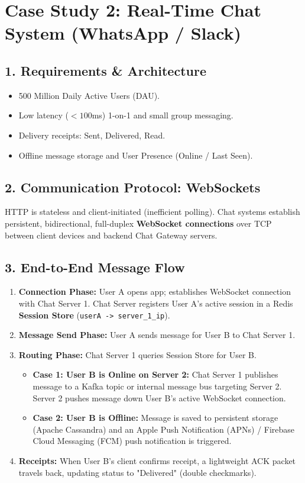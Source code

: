 \documentclass[10pt,journal,compsoc,onecolumn]{IEEEtran}
\begin{document}
\section{Case Study 2: Real-Time Chat System (WhatsApp / Slack)}
\label{sec:whatsapp}

\subsection{1. Requirements \& Architecture}
\begin{itemize}
    \item 500 Million Daily Active Users (DAU).
    \item Low latency ($< 100$ms) 1-on-1 and small group messaging.
    \item Delivery receipts: Sent, Delivered, Read.
    \item Offline message storage and User Presence (Online / Last Seen).
\end{itemize}

\subsection{2. Communication Protocol: WebSockets}
HTTP is stateless and client-initiated (inefficient polling). Chat systems establish persistent, bidirectional, full-duplex \textbf{WebSocket connections} over TCP between client devices and backend Chat Gateway servers.

\subsection{3. End-to-End Message Flow}
\begin{enumerate}
    \item \textbf{Connection Phase:} User A opens app; establishes WebSocket connection with Chat Server 1. Chat Server registers User A's active session in a Redis \textbf{Session Store} (\texttt{userA -> server\_1\_ip}).
    \item \textbf{Message Send Phase:} User A sends message for User B to Chat Server 1.
    \item \textbf{Routing Phase:} Chat Server 1 queries Session Store for User B.
    \begin{itemize}
        \item \textbf{Case 1: User B is Online on Server 2:} Chat Server 1 publishes message to a Kafka topic or internal message bus targeting Server 2. Server 2 pushes message down User B's active WebSocket connection.
        \item \textbf{Case 2: User B is Offline:} Message is saved to persistent storage (Apache Cassandra) and an Apple Push Notification (APNs) / Firebase Cloud Messaging (FCM) push notification is triggered.
    \end{itemize}
    \item \textbf{Receipts:} When User B's client confirms receipt, a lightweight ACK packet travels back, updating status to "Delivered" (double checkmarks).
\end{enumerate}
\end{document}
